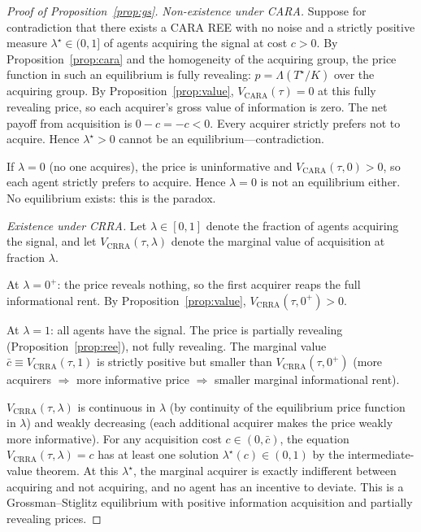 \documentclass[12pt,letterpaper]{article}
\theoremstyle{definition}
\theoremstyle{remark}
\newcommand{\Lam}{\Lambda}            %
\newcommand{\Tstar}{T^{\!\star}}
\newcommand{\1}{\mathbf{1}}
\begin{document}
\begin{proof}[Proof of Proposition~\ref{prop:gs}]
\emph{Non-existence under CARA.} Suppose for contradiction that there
exists a CARA REE with no noise and a strictly positive measure
$\lambda^{\star}\in(0,1]$ of agents acquiring the signal at cost $c>0$.
By Proposition~\ref{prop:cara} and the homogeneity of the acquiring
group, the price function in such an equilibrium is fully revealing:
$p=\Lam(\Tstar/K)$ over the acquiring group. By
Proposition~\ref{prop:value}, $V_{\mathrm{CARA}}(\tau)=0$ at this fully
revealing price, so each acquirer's gross value of information is zero.
The net payoff from acquisition is $0-c=-c<0$. Every acquirer strictly
prefers not to acquire. Hence $\lambda^{\star}>0$ cannot be an
equilibrium---contradiction.

If $\lambda=0$ (no one acquires), the price is uninformative and
$V_{\mathrm{CARA}}(\tau,0)>0$, so each agent strictly prefers to acquire.
Hence $\lambda=0$ is not an equilibrium either. No equilibrium exists:
this is the \citet{GrossmanStiglitz1980} paradox.

\emph{Existence under CRRA.} Let $\lambda\in[0,1]$ denote the fraction of
agents acquiring the signal, and let $V_{\mathrm{CRRA}}(\tau,\lambda)$
denote the marginal value of acquisition at fraction $\lambda$.

At $\lambda=0^{+}$: the price reveals nothing, so the first acquirer
reaps the full informational rent. By Proposition~\ref{prop:value},
$V_{\mathrm{CRRA}}(\tau,0^{+})>0$.

At $\lambda=1$: all agents have the signal. The price is partially
revealing (Proposition~\ref{prop:ree}), not fully revealing. The
marginal value $\bar c\equiv V_{\mathrm{CRRA}}(\tau,1)$ is strictly
positive but smaller than $V_{\mathrm{CRRA}}(\tau,0^{+})$ (more
acquirers $\Rightarrow$ more informative price $\Rightarrow$ smaller
marginal informational rent).

$V_{\mathrm{CRRA}}(\tau,\lambda)$ is continuous in $\lambda$ (by
continuity of the equilibrium price function in $\lambda$) and weakly
decreasing (each additional acquirer makes the price weakly more
informative). For any acquisition cost $c\in(0,\bar c)$, the equation
$V_{\mathrm{CRRA}}(\tau,\lambda)=c$ has at least one solution
$\lambda^{\star}(c)\in(0,1)$ by the intermediate-value theorem. At this
$\lambda^{\star}$, the marginal acquirer is exactly indifferent between
acquiring and not acquiring, and no agent has an incentive to deviate.
This is a Grossman--Stiglitz equilibrium with positive information
acquisition and partially revealing prices.
\end{proof}
\end{document}
